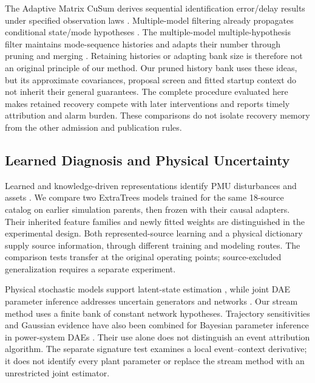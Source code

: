 The Adaptive Matrix CuSum derives sequential identification error/delay
results under specified observation laws \cite{warner2024matrix}.
Multiple-model filtering already propagates conditional state/mode
hypotheses \cite{blom1988imm}. The multiple-model multiple-hypothesis
filter maintains mode-sequence histories and adapts their number through
pruning and merging \cite{boers2005m3h}. Retaining histories or adapting
bank size is therefore not an original principle of our method.
Our pruned history bank uses these ideas,
but its approximate covariances, proposal screen and fitted startup context
do not inherit their general guarantees. The complete procedure evaluated
here makes retained recovery compete with later interventions and reports
timely attribution and alarm burden. These comparisons do not isolate
recovery memory from the other admission and publication rules.

\subsection{Learned Diagnosis and Physical Uncertainty}
Learned and knowledge-driven representations identify PMU disturbances and
assets \cite{pandey2020realtime,li2024knowledge,yildiz2024few}. We compare
two ExtraTrees models trained for the same 18-source catalog on earlier
simulation parents, then frozen with their causal adapters. Their inherited
feature families and newly fitted weights are distinguished in the
experimental design. Both represented-source learning and a physical
dictionary supply source information, through different training and
modeling routes. The comparison tests transfer at the original operating
points; source-excluded generalization requires a separate experiment.

Physical stochastic models support latent-state estimation
\cite{ensaf2023kernel,tartakovsky2023gp}, while joint DAE parameter inference
addresses uncertain generators and networks \cite{albustami2026dae}.
Our stream method uses a finite bank of constant network hypotheses.
Trajectory sensitivities and Gaussian evidence have also been combined
for Bayesian parameter inference in power-system DAEs
\cite{nagi2022trajectory}. Their use alone does not distinguish an event
attribution algorithm. The separate signature test examines a local event--context derivative;
it does not identify every plant parameter or replace the stream method
with an unrestricted joint estimator.

